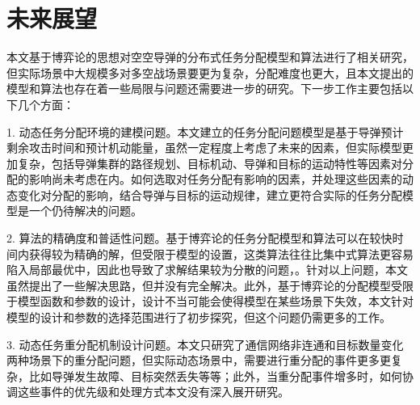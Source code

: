 \section{未来展望}

本文基于博弈论的思想对空空导弹的分布式任务分配模型和算法进行了相关研究，但实际场景中大规模多对多空战场景要更为复杂，分配难度也更大，且本文提出的模型和算法也存在着一些局限与问题还需要进一步的研究。下一步工作主要包括以下几个方面：

1. 动态任务分配环境的建模问题。本文建立的任务分配问题模型是基于导弹预计剩余攻击时间和预计机动能量，虽然一定程度上考虑了未来的因素，但实际模型更加复杂，包括导弹集群的路径规划、目标机动、导弹和目标的运动特性等因素对分配的影响尚未考虑在内。如何选取对任务分配有影响的因素，并处理这些因素的动态变化对分配的影响，结合导弹与目标的运动规律，建立更符合实际的任务分配模型是一个仍待解决的问题。

2. 算法的精确度和普适性问题。基于博弈论的任务分配模型和算法可以在较快时间内获得较为精确的解，但受限于模型的设置，这类算法往往比集中式算法更容易陷入局部最优中，因此也导致了求解结果较为分散的问题，。针对以上问题，本文虽然提出了一些解决思路，但并没有完全解决。此外，基于博弈论的分配模型受限于模型函数和参数的设计，设计不当可能会使得模型在某些场景下失效，本文针对模型的设计和参数的选择范围进行了初步探究，但这个问题仍需更多的工作。

3. 动态任务重分配机制设计问题。本文只研究了通信网络非连通和目标数量变化两种场景下的重分配问题，但实际动态场景中，需要进行重分配的事件更多更复杂，比如导弹发生故障、目标突然丢失等等；此外，当重分配事件增多时，如何协调这些事件的优先级和处理方式本文没有深入展开研究。

